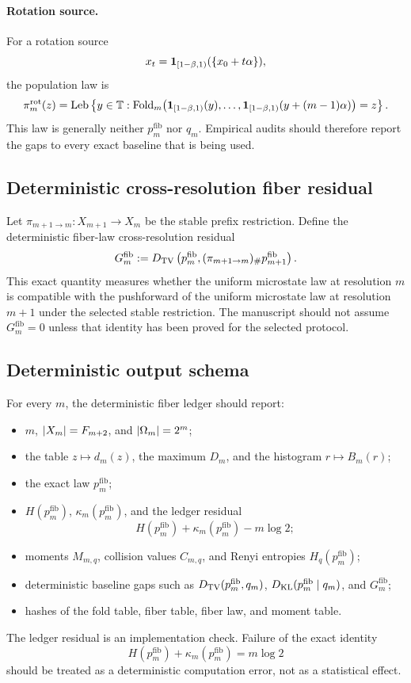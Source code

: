 \paragraph{Rotation source.}
For a rotation source
\[
x_t=\mathbf{1}_{[1-\beta,1)}(\{x_0+t\alpha\}),
\]
the population law is
\[
\pi_m^{\mathrm{rot}}(z)
=
\operatorname{Leb}
\left\{
y\in\mathbb T:
\operatorname{Fold}_m\bigl(
\mathbf{1}_{[1-\beta,1)}(y),
\ldots,
\mathbf{1}_{[1-\beta,1)}(y+(m-1)\alpha)
\bigr)=z
\right\}.
\]
This law is generally neither \(p_m^{\mathrm{fib}}\) nor \(q_m\).  Empirical audits should therefore report the gaps to every exact baseline that is being used.

\subsection{Deterministic cross-resolution fiber residual}

Let \(\pi_{m+1\to m}:X_{m+1}\to X_m\) be the stable prefix restriction.  Define the deterministic fiber-law cross-resolution residual
\[
G_m^{\mathrm{fib}}
:=
D_{\mathrm{TV}}\left(
p_m^{\mathrm{fib}},
(\pi_{m+1\to m})_\#p_{m+1}^{\mathrm{fib}}
\right).
\]
This exact quantity measures whether the uniform microstate law at resolution \(m\) is compatible with the pushforward of the uniform microstate law at resolution \(m+1\) under the selected stable restriction.  The manuscript should not assume \(G_m^{\mathrm{fib}}=0\) unless that identity has been proved for the selected protocol.

\subsection{Deterministic output schema}

For every \(m\), the deterministic fiber ledger should report:
\begin{itemize}[leftmargin=2em]
\item \(m\), \(\left|X_m\right|=F_{m+2}\), and \(\left|\Omega_m\right|=2^m\);
\item the table \(z\mapsto d_m(z)\), the maximum \(D_m\), and the histogram \(r\mapsto B_m(r)\);
\item the exact law \(p_m^{\mathrm{fib}}\);
\item \(H(p_m^{\mathrm{fib}})\), \(\kappa_m(p_m^{\mathrm{fib}})\), and the ledger residual
\[
H(p_m^{\mathrm{fib}})+\kappa_m(p_m^{\mathrm{fib}})-m\log2;
\]
\item moments \(M_{m,q}\), collision values \(C_{m,q}\), and Renyi entropies \(H_q(p_m^{\mathrm{fib}})\);
\item deterministic baseline gaps such as \(D_{\mathrm{TV}}(p_m^{\mathrm{fib}},q_m)\), \(D_{\mathrm{KL}}(p_m^{\mathrm{fib}}\mid q_m)\), and \(G_m^{\mathrm{fib}}\);
\item hashes of the fold table, fiber table, fiber law, and moment table.
\end{itemize}
The ledger residual is an implementation check.  Failure of the exact identity
\[
H(p_m^{\mathrm{fib}})+\kappa_m(p_m^{\mathrm{fib}})=m\log2
\]
should be treated as a deterministic computation error, not as a statistical effect.

